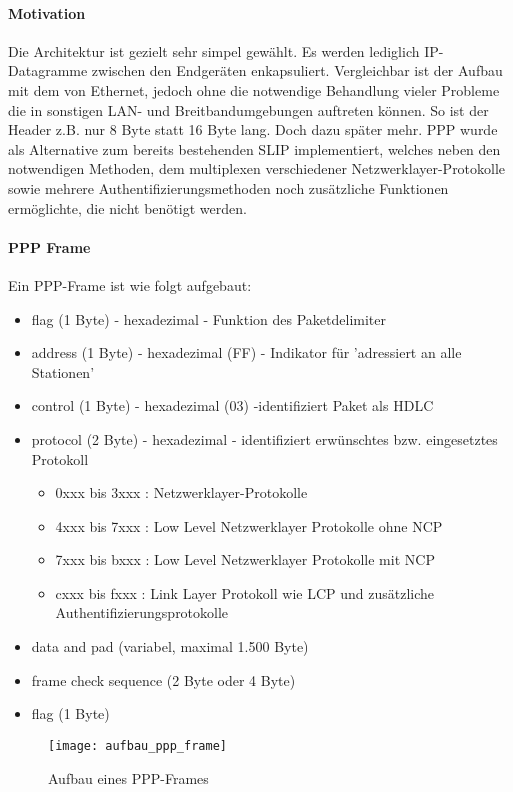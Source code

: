 \paragraph{Motivation} Die Architektur ist gezielt sehr simpel gewählt. Es werden lediglich IP-Datagramme zwischen den
Endgeräten enkapsuliert. Vergleichbar ist der Aufbau mit dem von Ethernet, jedoch ohne
die notwendige Behandlung vieler Probleme die in sonstigen \ac{LAN}- und Breitbandumgebungen
auftreten können. So ist der Header z.B. nur 8 Byte statt 16 Byte lang. Doch dazu später mehr.
\ac{PPP} wurde als Alternative zum bereits bestehenden \ac{SLIP} implementiert, welches neben den notwendigen
Methoden, dem multiplexen verschiedener Netzwerklayer-Protokolle sowie mehrere Authentifizierungsmethoden noch zusätzliche Funktionen ermöglichte, die nicht benötigt werden.

\paragraph{PPP Frame}
Ein \ac{PPP}-Frame ist wie folgt aufgebaut:

\begin{itemize}
\item flag (1 Byte) - hexadezimal - Funktion des Paketdelimiter
\item address (1 Byte) - hexadezimal (FF) - Indikator für 'adressiert an alle Stationen'
\item control (1 Byte) - hexadezimal (03) -identifiziert Paket als \ac{HDLC}
\item protocol (2 Byte) - hexadezimal - identifiziert erwünschtes bzw. eingesetztes Protokoll
	\begin{itemize}
		\item 0xxx bis 3xxx : Netzwerklayer-Protokolle
		\item 4xxx bis 7xxx : Low Level Netzwerklayer Protokolle ohne \ac{NCP}
		\item 7xxx bis bxxx : Low Level Netzwerklayer Protokolle mit \ac{NCP}
		\item cxxx bis fxxx : Link Layer Protokoll wie LCP und zusätzliche Authentifizierungsprotokolle
	\end{itemize}
\item data and pad (variabel, maximal 1.500 Byte)
\item frame check sequence (2 Byte oder 4 Byte)
\item flag (1 Byte)
\end{itemize}

 \begin{figure}[htp]
  \begin{center}
   \texttt{[image: aufbau\_ppp\_frame]}
  \end{center}
  \caption{Aufbau eines PPP-Frames}\cite{tcpipillustrated}
  \label{abb:aufbau_ppp_frame}
 \end{figure}


